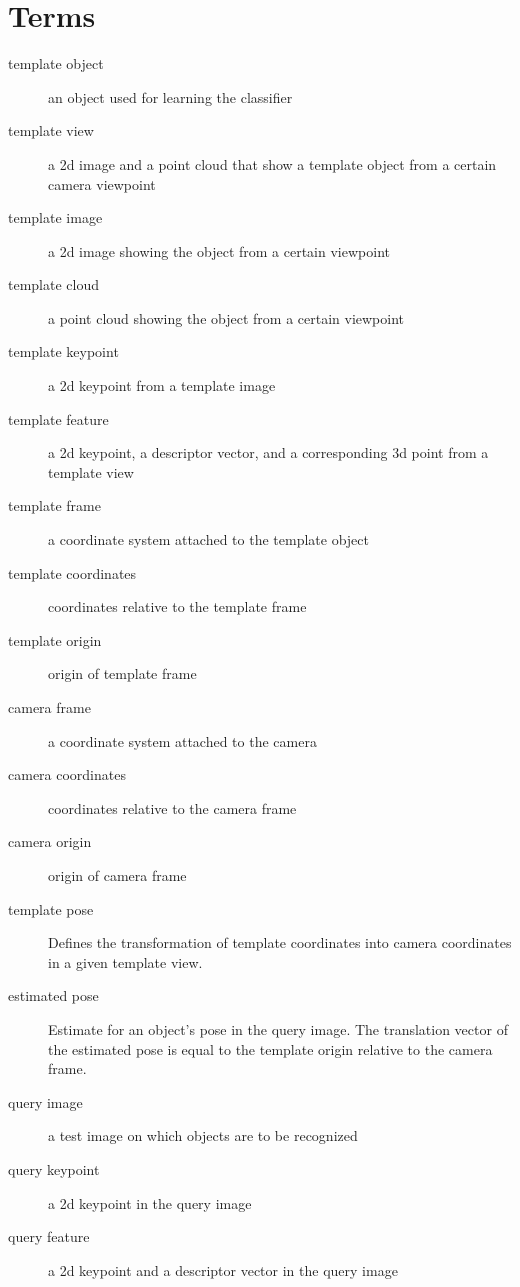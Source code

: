 \chapter{Terms}
\label{chapter:terms}

\begin{description}
    \item[template object] an object used for learning the classifier
    \item[template view] a 2d image and a point cloud that show a template object from a certain camera viewpoint
    \item[template image] a 2d image showing the object from a certain viewpoint
    \item[template cloud] a point cloud showing the object from a certain viewpoint
    \item[template keypoint] a 2d keypoint from a template image
    \item[template feature] a 2d keypoint, a descriptor vector, and a
        corresponding 3d point from a template view
    \item[template frame] a coordinate system attached to the template object 
    \item[template coordinates] coordinates relative to the template frame 
    \item[template origin] origin of template frame 
    \item[camera frame] a coordinate system attached to the camera 
    \item[camera coordinates] coordinates relative to the camera frame 
    \item[camera origin] origin of camera frame 
    \item[template pose] Defines the transformation of template coordinates into
        camera coordinates in a given template view. 
    \item[estimated pose] Estimate for an object's pose in the query image. The
        translation vector of the estimated pose is equal to the template origin
        relative to the camera frame.
    \item[query image] a test image on which objects are to be recognized 
    \item[query keypoint] a 2d keypoint in the query image
    \item[query feature] a 2d keypoint and a descriptor vector in the query image
\end{description}


